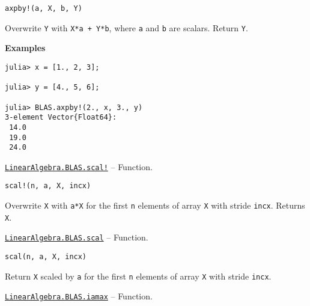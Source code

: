 \begin{adjustwidth}{2em}{0pt}


\begin{verbatim}
axpby!(a, X, b, Y)
\end{verbatim}

Overwrite \texttt{Y} with \texttt{X*a + Y*b}, where \texttt{a} and \texttt{b} are scalars. Return \texttt{Y}.

\textbf{Examples}


\begin{verbatim}
julia> x = [1., 2, 3];

julia> y = [4., 5, 6];

julia> BLAS.axpby!(2., x, 3., y)
3-element Vector{Float64}:
 14.0
 19.0
 24.0
\end{verbatim}



\end{adjustwidth}
\hypertarget{1309689219983162396}{}
\hyperlink{1309689219983162396}{\texttt{LinearAlgebra.BLAS.scal!}}  -- {Function.}

\begin{adjustwidth}{2em}{0pt}


\begin{verbatim}
scal!(n, a, X, incx)
\end{verbatim}

Overwrite \texttt{X} with \texttt{a*X} for the first \texttt{n} elements of array \texttt{X} with stride \texttt{incx}. Returns \texttt{X}.



\end{adjustwidth}
\hypertarget{12895642275868597015}{}
\hyperlink{12895642275868597015}{\texttt{LinearAlgebra.BLAS.scal}}  -- {Function.}

\begin{adjustwidth}{2em}{0pt}


\begin{verbatim}
scal(n, a, X, incx)
\end{verbatim}

Return \texttt{X} scaled by \texttt{a} for the first \texttt{n} elements of array \texttt{X} with stride \texttt{incx}.



\end{adjustwidth}
\hypertarget{7368077295193322508}{}
\hyperlink{7368077295193322508}{\texttt{LinearAlgebra.BLAS.iamax}}  -- {Function.}


